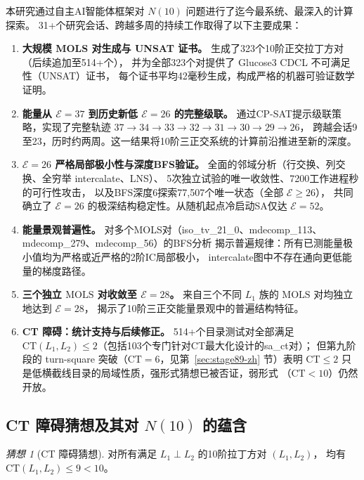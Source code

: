 \documentclass[11pt,a4paper]{ctexart}
\theoremstyle{remark}
\newtheorem{conjecture}[theorem]{猜想}
\newcommand{\CT}{\mathrm{CT}}
\newcommand{\E}{\mathcal{E}}
\newcommand{\MOLS}{\mathrm{MOLS}}
\begin{document}
本研究通过自主AI智能体框架对 $N(10)$ 问题进行了迄今最系统、最深入的计算探索。
31+个研究会话、跨越多周的持续工作取得了以下主要成果：

\begin{enumerate}[leftmargin=2.5em,label=\textbf{成果\arabic*.}]
  \item \textbf{大规模 MOLS 对生成与 UNSAT 证书。}
    生成了323个10阶正交拉丁方对（后续追加至514+个），
    并为全部323个对提供了 Glucose3 CDCL 不可满足性（UNSAT）证书，
    每个证书平均42毫秒生成，构成严格的机器可验证数学证明。

  \item \textbf{能量从 $\E = 37$ 到历史新低 $\E = 26$ 的完整级联。}
    通过CP-SAT提示级联策略，实现了完整轨迹
    $37 \to 34 \to 33 \to 32 \to 31 \to 30 \to 29 \to 26$，
    跨越会话9至23，历时约两周。这一结果将10阶三正交系统的计算前沿推进至新的深度。

  \item \textbf{$\E = 26$ 严格局部极小性与深度BFS验证。}
    全面的邻域分析（行交换、列交换、全穷举 intercalate、LNS）、
    5次独立试验的唯一收敛性、7200工作进程秒的可行性攻击，
    以及BFS深度6探索77,507个唯一状态（全部 $\E \geq 26$），
    共同确立了 $\E = 26$ 的极深结构稳定性。从随机起点冷启动SA仅达 $\E=52$。

  \item \textbf{能量景观普遍性。}
    对多个MOLS对（iso\_tv\_21\_0、mdecomp\_113、mdecomp\_279、mdecomp\_56）的BFS分析
    揭示普遍规律：所有已测能量极小值均为严格或近严格的2阶IC局部极小，
    intercalate图中不存在通向更低能量的梯度路径。

  \item \textbf{三个独立 $\MOLS$ 对收敛至 $\E = 28$。}
    来自三个不同 $L_1$ 族的 $\MOLS$ 对均独立地达到 $\E = 28$，
    揭示了10阶三正交能量景观中的普遍结构特征。

  \item \textbf{CT 障碍：统计支持与后续修正。}
    514+个目录测试对全部满足 $\CT(L_1, L_2) \le 2$（包括103个专门针对CT最大化设计的sa\_ct对）；
    但第九阶段的 turn-square 突破（$\CT=6$，见第~\ref{sec:stage89-zh} 节）表明
    $\CT\le2$ 只是低横截线目录的局域性质，强形式猜想已被否证，弱形式
    （$\CT<10$）仍然开放。
\end{enumerate}

\subsection{CT 障碍猜想及其对 $N(10)$ 的蕴含}

\begin{conjecture}[CT 障碍猜想]
  \label{conj:ct-barrier2}
  对所有满足 $L_1 \perp L_2$ 的10阶拉丁方对 $(L_1, L_2)$，
  均有 $\CT(L_1, L_2) \le 9 < 10$。
\end{conjecture}
\end{document}

